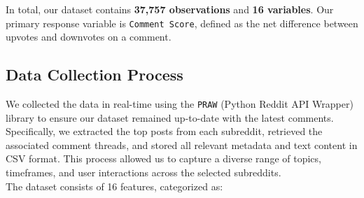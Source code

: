 \documentclass[10pt]{article}
\begin{document}
\noindent In total, our dataset contains \textbf{37,757 observations} and \textbf{16 variables}. Our primary response variable is \texttt{Comment Score}, defined as the net difference between upvotes and downvotes on a comment.


\subsection{Data Collection Process}
We collected the data in real-time using the \texttt{PRAW} (Python Reddit API Wrapper) \cite{praw2024} library to ensure our dataset remained up-to-date with the latest comments. Specifically, we extracted the top posts from each subreddit, retrieved the associated comment threads, and stored all relevant metadata and text content in CSV format. This process allowed us to capture a diverse range of topics, timeframes, and user interactions across the selected subreddits. \\

\noindent The dataset consists of 16 features, categorized as:
\end{document}
